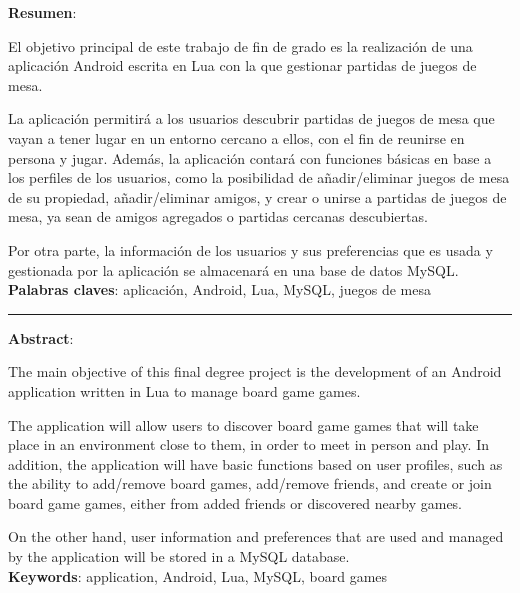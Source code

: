 \textbf{Resumen}:

El objetivo principal de este trabajo de fin de grado es la realización de una aplicación Android escrita en Lua con la que gestionar partidas de juegos de mesa.

La aplicación permitirá a los usuarios descubrir partidas de juegos de mesa que vayan a tener lugar en un entorno cercano a ellos, con el fin de reunirse en persona y jugar. Además, la aplicación contará con funciones básicas en base a los perfiles de los usuarios, como la posibilidad de añadir/eliminar juegos de mesa de su propiedad, añadir/eliminar amigos, y crear o unirse a partidas de juegos de mesa, ya sean de amigos agregados o partidas cercanas descubiertas.

Por otra parte, la información de los usuarios y sus preferencias que es usada y gestionada por la aplicación se almacenará en una base de datos MySQL.
\\

\textbf{Palabras claves}: aplicación, Android, Lua, MySQL, juegos de mesa


\vspace{1cm}

\begin{center}
    \rule{0.5\textwidth}{.4pt}
\end{center}

\vspace{1cm}


\textbf{Abstract}:

The main objective of this final degree project is the development of an Android application written in Lua to manage board game games.

The application will allow users to discover board game games that will take place in an environment close to them, in order to meet in person and play. In addition, the application will have basic functions based on user profiles, such as the ability to add/remove board games, add/remove friends, and create or join board game games, either from added friends or discovered nearby games.

On the other hand, user information and preferences that are used and managed by the application will be stored in a MySQL database.
\\

\textbf{Keywords}: application, Android, Lua, MySQL, board games
